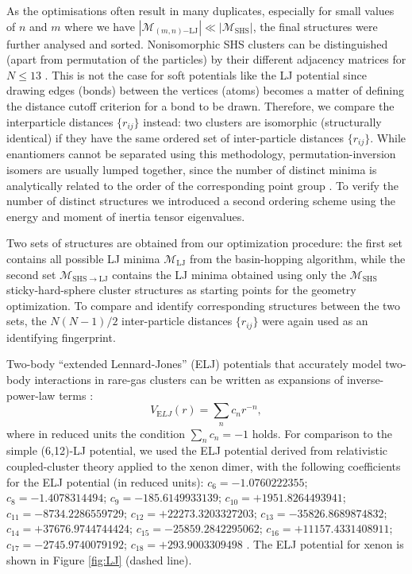 As the optimisations often result in many duplicates, especially for small
values of $n$ and $m$ where we have
$|\mathcal{M}_{(m,n)\mathrm{-LJ}}| \ll |\mathcal{M}_\mathrm{SHS}|$, the final
structures were further analysed and sorted. Nonisomorphic \ac{SHS} clusters can be
distinguished (apart from permutation of the particles) by their different
adjacency matrices for $N \leq 13$ \autocite{Holmes-Cerfon_EnumeratingRigidSphere_2016}.  This is not the case for
soft potentials like the LJ potential since drawing edges (bonds) between the
vertices (atoms) becomes a matter of defining the distance cutoff criterion
for a bond to be drawn. Therefore, we compare the interparticle distances $\{r_{ij}\}$
instead: two clusters are isomorphic (structurally identical) if they have the same ordered
set of inter-particle distances $\{r_{ij}\}$.  While enantiomers cannot be
separated using this methodology, permutation-inversion isomers are usually
lumped together, since the number of distinct minima is analytically related to
the order of the corresponding point group \autocite{wales04}.  To verify the
number of distinct structures we introduced a second ordering scheme using the
energy and moment of inertia tensor eigenvalues. 

Two sets of structures are obtained from our optimization procedure: the first
set contains all possible LJ minima $\mathcal{M}_\mathrm{LJ}$ from the basin-hopping
algorithm, while the second set $\mathcal{M}_\mathrm{SHS\to LJ}$ contains the
LJ minima obtained using only the $\mathcal{M}_\mathrm{SHS}$ sticky-hard-sphere cluster structures as starting points for the geometry optimization.
To compare and identify corresponding structures between the two sets, the
$N(N-1)/2$ inter-particle distances $\{r_{ij}\}$ were again used as an identifying fingerprint.

Two-body ``extended Lennard-Jones'' (ELJ) potentials that accurately model two-body interactions in rare-gas clusters can be written as expansions of inverse-power-law terms \autocite{Schwerdtfeger_ExtensionLennardJonespotential_2006}:
\begin{equation} \label{eq:ELJ}
V_{\mathrm ELJ}(r)=\sum_{n} c_nr^{-n},
\end{equation}
where in reduced units the condition $\sum_{n} c_n=-1$ holds.
For comparison to the simple (6,12)-LJ potential, we used the ELJ potential
derived from relativistic coupled-cluster theory applied to the xenon dimer,
with the following coefficients for the ELJ potential (in reduced units):
$c_6=-1.0760222355$; $c_8=-1.4078314494$; $c_9=-185.6149933139$;
$c_{10}=+1951.8264493941$; $c_{11}=-8734.2286559729$;
$c_{12}=+22273.3203327203$; $c_{13}=-35826.8689874832$;
$c_{14}=+37676.9744744424$; $c_{15}=-25859.2842295062$;
$c_{16}=+11157.4331408911$; $c_{17}=-2745.9740079192$; $c_{18}=+293.9003309498$
\autocite{Jerabek_relativisticcoupledclusterinteraction_2017}. The ELJ potential for xenon is shown in
Figure \ref{fig:LJ} (dashed line).



